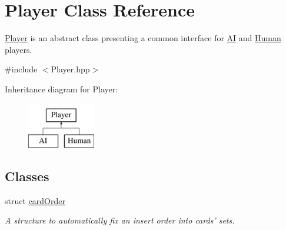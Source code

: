 \hypertarget{classPlayer}{\section{Player Class Reference}
\label{classPlayer}
}


\hyperlink{classPlayer}{Player} is an abstract class presenting a common interface for \hyperlink{classAI}{A\-I} and \hyperlink{classHuman}{Human} players.  




{\ttfamily \#include $<$Player.\-hpp$>$}

Inheritance diagram for Player\-:\begin{figure}[H]
\begin{center}
\leavevmode
\includegraphics[height=2.000000cm]{classPlayer}
\end{center}
\end{figure}
\subsection*{Classes}
\begin{DoxyCompactItemize}
\item 
struct \hyperlink{structPlayer_1_1cardOrder}{card\-Order}
\begin{DoxyCompactList}\small\item\em A structure to automatically fix an insert order into cards' sets. \end{DoxyCompactList}\end{DoxyCompactItemize}
